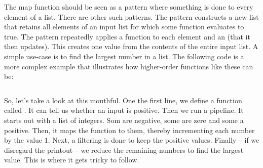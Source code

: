 The map function should be seen as a pattern where something is done to every element of a list. There are other such patterns. The  pattern constructs a new list that retains all elements of an input list for which some function evaluates to true. The  pattern repeatedly applies a function to each element and an  (that it then updates). This creates one value from the contents of the entire input list. A simple use-case is to find the largest number in a list. The following code is a more complex example that illustrates how  higher-order functions like these can be:

\inputminted[firstline=4]{elixir}{../src/elixir/functions/large/large.exs} %

So, let's take a look at this mouthful. One the first line, we define a function called . It can tell us whether an input is positive. Then we run a pipeline. It starts out with a list of integers. Som are negative, some are zere and some a positive. Then, it maps the  function to them, thereby incrementing each number by the value 1. Next, a filtering is done to keep the positive values. Finally -- if we disregard the printout -- we reduce the remaining numbers to find the largest value. This is where it gets tricky to follow.

